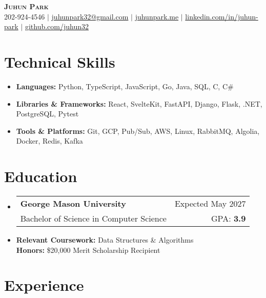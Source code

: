 \documentclass[letterpaper,11pt]{article}
\makeatletter
\newcommand{\resumeItem}[1]{
  \item{
    {#1}
  }
}
\newcommand{\resumeItemThin}[1]{
  \item{
    {#1 \vspace{-5pt}}
  }
}
\newcommand{\resumeSubheading}[4]{
    \item
    \begin{tabular*}{0.985\textwidth}[t]{l@{\extracolsep{\fill}}r@{\hspace{-0.1in}}}
        {\textbf{#1}} & {#2} \\
        #3 &  #4 \\
    \end{tabular*}\vspace{-5pt}
}
\newcommand{\resumeSubHeadingListStart}{\begin{itemize}[leftmargin=0.00in, rightmargin=-0.2in, label={}]\vspace{3pt}}
\newcommand{\resumeSubHeadingListEnd}{\end{itemize}\vspace{-5pt}}
\newcommand{\resumeItemListStart}{\vspace{3pt}\begin{itemize}[leftmargin=0.15in, rightmargin=0.15in]}
\newcommand{\resumeItemListEnd}{\end{itemize}\vspace{-5pt}}
\makeatother
\begin{document}

\begin{center}
  \textbf{\Huge \scshape {Juhun Park}} \\ \vspace{3pt}
   202-924-4546 $|$
  \href{mailto:juhunpark32@gmail.com}{juhunpark32@gmail.com} $|$
  \href{https://www.juhunpark.me/}{juhunpark.me} $|$
  \href{https://linkedin.com/in/juhun-park}{linkedin.com/in/juhun-park} $|$
  \href{https://github.com/juhun32}{github.com/juhun32} \\
\end{center}

\vspace{-10pt}


\section{Technical Skills}
\resumeItemListStart
\resumeItemThin{\textbf{Languages: }{Python, TypeScript, JavaScript, Go, Java, SQL, C, C\#}}\\
\resumeItemThin{\textbf{Libraries \& Frameworks: }{React, SvelteKit, FastAPI, Django, Flask, .NET, PostgreSQL, Pytest}}\\
\resumeItemThin{\textbf{Tools \& Platforms: }{Git, GCP, Pub/Sub, AWS, Linux, RabbitMQ, Algolia, Docker, Redis, Kafka}}\\
\resumeItemListEnd

\vspace{-5pt}


\section{Education}
\resumeSubHeadingListStart
\resumeSubheading
{George Mason University}{Expected May 2027}
{Bachelor of Science in Computer Science}{GPA: \textbf{3.9}}
\resumeItem{\textbf{Relevant Coursework: }{Data Structures \& Algorithms}} \\
{\textbf{Honors: }{\$20,000 Merit Scholarship Recipient}}
\resumeSubHeadingListEnd

\vspace{-10pt}


\section{Experience}
\end{document}
